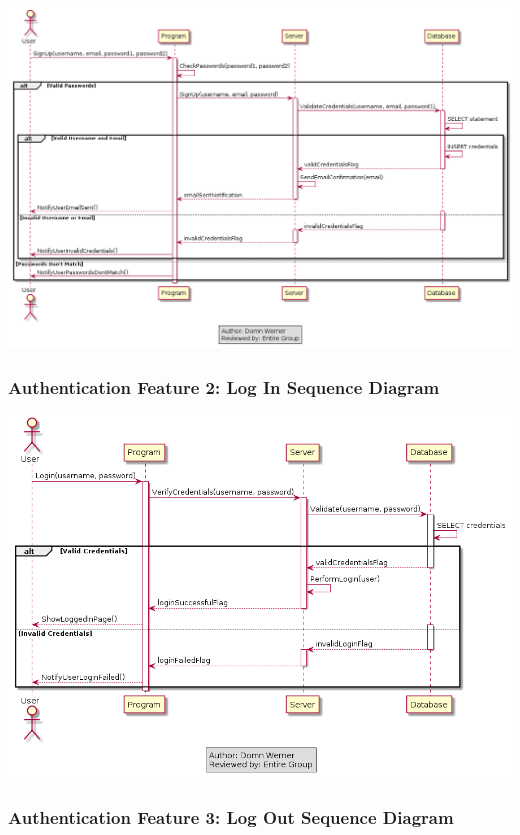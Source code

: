 \documentclass[twoside,letterpaper]{article}
\begin{document}
	\bigskip
	
	\includegraphics[width=6.0in]{images/SequenceDiagrams/AuthenticationSignUp}
	
	\newpage

	\subsubsection[Authentication Feature 2: Log In Sequence Diagram]{\rmfamily\bfseries\color{black}
		Authentication Feature 2: Log In Sequence Diagram}
	\hypertarget{RefHeading22059017292}{}
	
	\bigskip
	
	\includegraphics[width=6.0in]{images/SequenceDiagrams/AuthenticationLogIn}
	\label{a:sd2}
	\newpage
	
	
	\subsubsection[Authentication Feature 3: Log Out Sequence Diagram]{\rmfamily\bfseries\color{black}
		Authentication Feature 3: Log Out Sequence Diagram}
		\label{a:sd3}
	\hypertarget{RefHeading22059017292}{}
	
\end{document}

